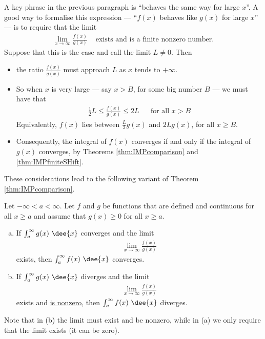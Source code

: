 A key phrase in the previous paragraph is ``behaves the same way for large
$x$''. A good way to formalise this expression --- ``$f(x)$ behaves like $g(x)$
for large $x$'' --- is to require that the limit
\begin{align*}
\lim_{x\rightarrow\infty}\frac{f(x)}{g(x)} & \text{ exists and is a finite
nonzero number.}
\end{align*}
Suppose that this is the case and call the limit $L\ne 0$. Then
\begin{itemize}
 \item the ratio $\frac{f(x)}{g(x)}$ must approach $L$ as $x$
tends to $+\infty$.
\item So when $x$ is very large --- say $x>B$, for some
big number $B$ --- we must have that
\begin{align*}
  \frac{1}{2}L \leq \frac{f(x)}{g(x)} \leq 2L && \text{for all $x>B$}
\end{align*}
Equivalently, $f(x)$ lies between $\frac{L}{2}g(x)$ and $2Lg(x)$, for all
$x\ge B$.

\item Consequently, the integral of $f(x)$ converges if and only if the
integral of $g(x)$ converges, by Theorems \ref{thm:IMPcomparison} and
\ref{thm:IMPfiniteSHift}.
\end{itemize}
These considerations lead to the following variant of Theorem
\ref{thm:IMPcomparison}.

\begin{theorem}\label{thm:IMPcomparisonLim}
Let $-\infty<a<\infty$. Let $f$ and $g$ be functions that are defined
and continuous for all $x\ge a$ and assume that  $g(x)\ge 0$ for all
$x\ge a$.
\begin{enumerate}[(a)]
\item If  $\int_a^\infty g(x)\ \dee{x}$ converges and the limit
\begin{align*}
\lim_{x\rightarrow\infty}\frac{f(x)}{g(x)}
\end{align*}
exists, then $\int_a^\infty f(x)\ \dee{x}$ converges.
\item If $\int_a^\infty g(x)\ \dee{x}$  diverges and the limit
\begin{align*}
\lim_{x\rightarrow\infty}\frac{f(x)}{g(x)}
\end{align*}
exists and \underline{is nonzero}, then $\int_a^\infty f(x)\ \dee{x}$ diverges.
\end{enumerate}
Note that in (b) the limit must exist and be nonzero, while in (a) we only
require that the limit exists (it can be zero).
\end{theorem}

